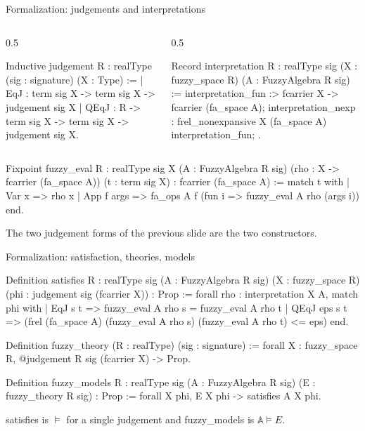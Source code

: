 \documentclass[10pt,aspectratio=169]{beamer}
\newcommand{\rid}[1]{{\ttfamily\small #1}}
\begin{document}
\begin{frame}[fragile]{Formalization: judgements and interpretations}
    \begin{columns}[T]
        \begin{column}{0.5\textwidth}
            \begin{srcbox}
Inductive judgement {R : realType}
    (sig : signature) (X : Type) :=
  | EqJ  : term sig X -> term sig X ->
           judgement sig X
  | QEqJ : R -> term sig X -> term sig X ->
           judgement sig X.
            \end{srcbox}
        \end{column}
        \begin{column}{0.5\textwidth}
            \begin{srcbox}
Record interpretation
    {R : realType} {sig}
    (X : fuzzy_space R)
    (A : FuzzyAlgebra R sig) := {
  interpretation_fun :>
    fcarrier X -> fcarrier (fa_space A);
  interpretation_nexp :
    frel_nonexpansive X (fa_space A)
      interpretation_fun;
}.
            \end{srcbox}
        \end{column}
    \end{columns}
    \vfill
    \begin{srcbox}
Fixpoint fuzzy_eval {R : realType} {sig X} (A : FuzzyAlgebra R sig)
    (rho : X -> fcarrier (fa_space A)) (t : term sig X) :
    fcarrier (fa_space A) :=
  match t with
  | Var x => rho x
  | App f args => fa_ops A f (fun i => fuzzy_eval A rho (args i))
  end.
    \end{srcbox}
    The two judgement forms of the previous slide are the two
    constructors.
\end{frame}

\begin{frame}[fragile]{Formalization: satisfaction, theories, models}
    \begin{srcbox}
Definition satisfies {R : realType} {sig} (A : FuzzyAlgebra R sig)
    (X : fuzzy_space R) (phi : judgement sig (fcarrier X)) : Prop :=
  forall rho : interpretation X A,
    match phi with
    | EqJ s t => fuzzy_eval A rho s = fuzzy_eval A rho t
    | QEqJ eps s t =>
      (frel (fa_space A) (fuzzy_eval A rho s) (fuzzy_eval A rho t) <= eps)%
    end.

Definition fuzzy_theory (R : realType) (sig : signature) :=
  forall X : fuzzy_space R, @judgement R sig (fcarrier X) -> Prop.

Definition fuzzy_models {R : realType} {sig} (A : FuzzyAlgebra R sig)
    (E : fuzzy_theory R sig) : Prop :=
  forall X phi, E X phi -> satisfies A X phi.
    \end{srcbox}
    \vfill
    \rid{satisfies} is $\models$ for a single judgement and
    \rid{fuzzy\_models} is $\mathbb{A} \models E$.
\end{frame}
\end{document}
